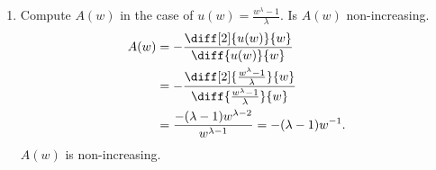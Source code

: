 \documentclass[a4paper, 12pt]{config/homework}
\begin{document}
\begin{enumerate}
\begin{enumerate}[label=(\alph*)]
\item Compute \(A(w)\) in the case of \(u(w)=\frac{w^{\lambda} - 1}{\lambda}\). Is \(A(w)\) non-increasing.
\begin{align*}
A(w) &= -\frac{\diff[2]{u(w)}{w}}{\diff{u(w)}{w}}
\\&= -\frac{\diff[2]{\frac{w^\lambda - 1}{\lambda}}{w}}{\diff{\frac{w^\lambda - 1}{\lambda}}{w}}
\\&= \frac{-(\lambda-1)w^{\lambda -2}}{w^{\lambda - 1}} = -(\lambda - 1)w^{-1}.
\end{align*}
\(A(w)\) is non-increasing.

\end{enumerate}
\end{enumerate}
\end{document}

